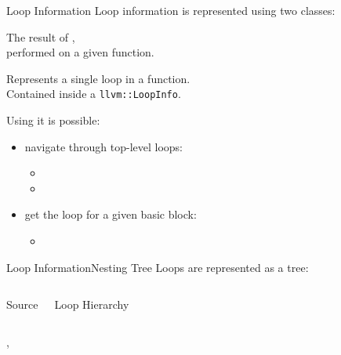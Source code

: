 \begin{frame}{Loop Information}
Loop information is represented using two classes:

\begin{description}
\item[\texttt{llvm::LoopInfo}]
			The result of ,\\
			performed on a given function.
\item[\texttt{llvm::Loop}]
			Represents a single loop in a function.\\
			Contained inside a \texttt{llvm::LoopInfo}.
\end{description}

\vfill
Using  it is possible:

\begin{itemize}
\item navigate through top-level loops:
\begin{itemize}
\item {}
\item {}
\end{itemize}
\item get the loop for a given basic block:
\begin{itemize}
\item {}
\end{itemize}
\end{itemize}
\end{frame}


\begin{frame}{Loop Information}{Nesting Tree}
Loops are represented as a \alert{tree}:\\
\begin{columns}
\begin{block}{Source\vphantom{Loop Nest}}
\cinput[\tt\fontsize{7.5pt}{7.5pt}\selectfont]{snippet/loop-nest.c}
\end{block}
\begin{block}{Loop Hierarchy}
\centering

\end{block}
\end{columns}
\vfill
\begin{description}
\item[children loops] ,
\item[parent loop] 
\end{description}
\end{frame}


